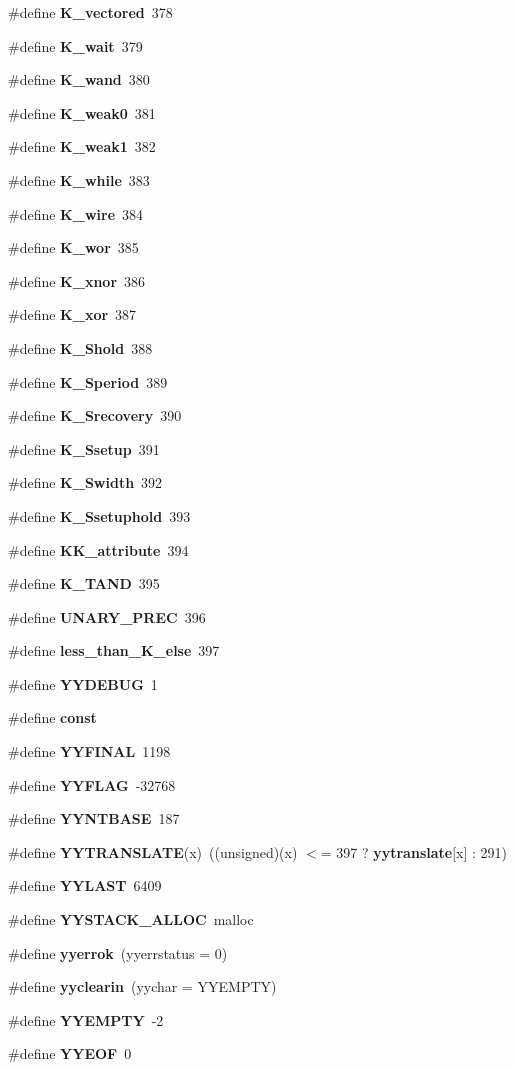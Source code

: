 \begin{CompactItemize}
\item 
\#define {\bf K\_\-vectored}\ 378
\item 
\#define {\bf K\_\-wait}\ 379
\item 
\#define {\bf K\_\-wand}\ 380
\item 
\#define {\bf K\_\-weak0}\ 381
\item 
\#define {\bf K\_\-weak1}\ 382
\item 
\#define {\bf K\_\-while}\ 383
\item 
\#define {\bf K\_\-wire}\ 384
\item 
\#define {\bf K\_\-wor}\ 385
\item 
\#define {\bf K\_\-xnor}\ 386
\item 
\#define {\bf K\_\-xor}\ 387
\item 
\#define {\bf K\_\-Shold}\ 388
\item 
\#define {\bf K\_\-Speriod}\ 389
\item 
\#define {\bf K\_\-Srecovery}\ 390
\item 
\#define {\bf K\_\-Ssetup}\ 391
\item 
\#define {\bf K\_\-Swidth}\ 392
\item 
\#define {\bf K\_\-Ssetuphold}\ 393
\item 
\#define {\bf KK\_\-attribute}\ 394
\item 
\#define {\bf K\_\-TAND}\ 395
\item 
\#define {\bf UNARY\_\-PREC}\ 396
\item 
\#define {\bf less\_\-than\_\-K\_\-else}\ 397
\item 
\#define {\bf YYDEBUG}\ 1
\item 
\#define {\bf const}
\item 
\#define {\bf YYFINAL}\ 1198
\item 
\#define {\bf YYFLAG}\ -32768
\item 
\#define {\bf YYNTBASE}\ 187
\item 
\#define {\bf YYTRANSLATE}(x)\ ((unsigned)(x) $<$= 397 ? {\bf yytranslate}[x] : 291)
\item 
\#define {\bf YYLAST}\ 6409
\item 
\#define {\bf YYSTACK\_\-ALLOC}\ malloc
\item 
\#define {\bf yyerrok}\ (yyerrstatus = 0)
\item 
\#define {\bf yyclearin}\ (yychar = YYEMPTY)
\item 
\#define {\bf YYEMPTY}\ -2
\item 
\#define {\bf YYEOF}\ 0
\item 

\end{CompactItemize}
